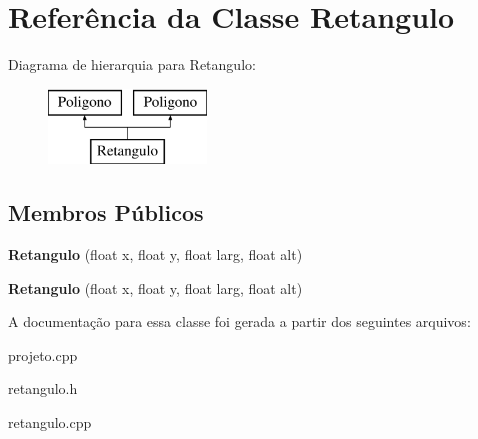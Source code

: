 \hypertarget{classRetangulo}{}\section{Referência da Classe Retangulo}
\label{classRetangulo}
Diagrama de hierarquia para Retangulo\+:\begin{figure}[H]
\begin{center}
\leavevmode
\includegraphics[height=2.000000cm]{classRetangulo}
\end{center}
\end{figure}
\subsection*{Membros Públicos}
\begin{DoxyCompactItemize}
\item 
\mbox{\label{classRetangulo_a92ef3678e78c886880e62e181684104a}} 
{\bfseries Retangulo} (float x, float y, float larg, float alt)
\item 
\mbox{\label{classRetangulo_a92ef3678e78c886880e62e181684104a}} 
{\bfseries Retangulo} (float x, float y, float larg, float alt)
\end{DoxyCompactItemize}


A documentação para essa classe foi gerada a partir dos seguintes arquivos\+:\begin{DoxyCompactItemize}
\item 
projeto.\+cpp\item 
retangulo.\+h\item 
retangulo.\+cpp\end{DoxyCompactItemize}
